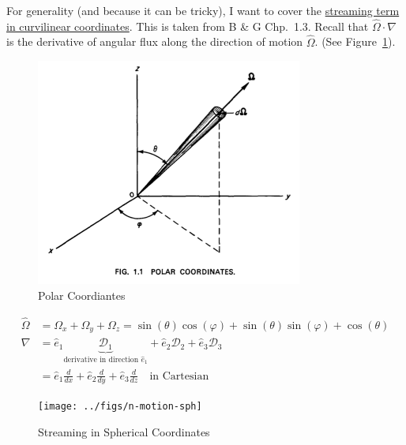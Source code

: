 \documentclass[12pt]{article}
\newcommand{\vOmega}{\ensuremath{\hat{\Omega}}}
\begin{document}
For generality (and because it can be tricky), I want to cover the \underline{streaming term in curvilinear coordinates}. 
 This is taken from B \& G Chp.\ 1.3.
Recall that $\vOmega \cdot \nabla$ is the derivative of angular flux along the direction of motion $\vOmega$. (See Figure~\ref{fig:cart-coord}).
%
\begin{figure}[h!]
    \begin{center}
    \includegraphics[keepaspectratio, width = 3.75 in]{../figs/polar-coords}
    \end{center}   
    \caption{Polar Coordiantes}
    \label{fig:cart-coord}
\end{figure}
%
\begin{align*}
\vOmega &= \Omega_x + \Omega_y + \Omega_z =  \sin(\theta)\cos(\varphi) + \sin(\theta)\sin(\varphi) + \cos(\theta)\\
\nabla &= \hat{e}_1 \underbrace{\mathcal{D}_1}_{\text{derivative in direction }\hat{e}_1} + \hat{e}_2 \mathcal{D}_2 + \hat{e}_3 \mathcal{D}_3\\
&= \hat{e}_1 \frac{d}{dx} + \hat{e}_2 \frac{d}{dy} + \hat{e}_3 \frac{d}{dz} \quad \text{in Cartesian}
\end{align*}

\begin{figure}[h!]
    \begin{center}
    \texttt{[image: ../figs/n-motion-sph]}
    \end{center}    
    \caption{Streaming in Spherical Coordinates}
    \label{fig:sph-m} 
\end{figure}
\end{document}
